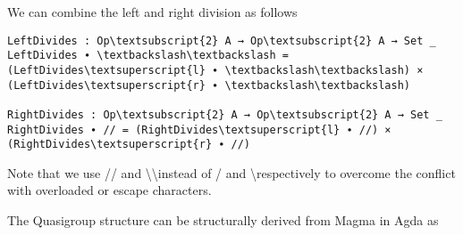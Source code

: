  We can combine the left and right division as follows

\begin{Verbatim}[commandchars=\\\{\},samepage=true]
LeftDivides : Op\textsubscript{2} A → Op\textsubscript{2} A → Set _
LeftDivides ∙ \textbackslash\textbackslash = (LeftDivides\textsuperscript{l} ∙ \textbackslash\textbackslash) × (LeftDivides\textsuperscript{r} ∙ \textbackslash\textbackslash)

RightDivides : Op\textsubscript{2} A → Op\textsubscript{2} A → Set _
RightDivides ∙ // = (RightDivides\textsuperscript{l} ∙ //) × (RightDivides\textsuperscript{r} ∙ //)
\end{Verbatim}

Note that we use // and \textbackslash\textbackslash instead of / and \textbackslash respectively to overcome the conflict with overloaded or escape characters. 

The Quasigroup structure can be structurally derived from Magma in Agda as 

